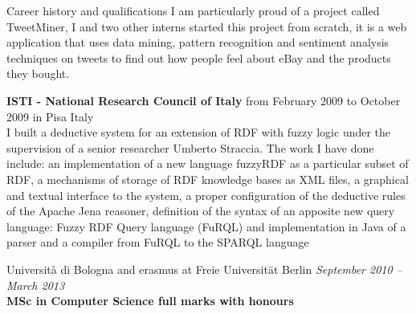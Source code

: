 \documentclass{resume}
\begin{document}
\begin{rSection}{Career history and qualifications}
			I am particularly proud of a project called TweetMiner, 
			I and two other interns started this project from scratch,
			it is a web application that uses data mining, pattern recognition and sentiment analysis 
			techniques on tweets to find out how people feel about eBay and the products they bought. 


		{\bf ISTI - National Research Council of Italy} from February 2009 to October 2009 in Pisa Italy\\
			I built a deductive system for an extension of RDF with fuzzy logic under the supervision of a senior researcher Umberto Straccia.
			The work I have done include:
			an implementation of a new language fuzzyRDF as a particular subset of RDF,
			a mechanisms of storage of RDF knowledge bases as XML files,
			a graphical and textual interface to the system,
			a proper configuration of the deductive rules of the Apache Jena reasoner,
			definition of the syntax of an apposite new query language: Fuzzy RDF Query language (FuRQL)
			and implementation in Java of a parser and a compiler from FuRQL to the SPARQL language  


		Universit\`a di Bologna and erasmus at Freie Universit\"at Berlin \hfill {\em September 2010 -- March 2013} \\
		{\bf MSc in Computer Science full marks with honours}


\end{rSection}
\end{document}
